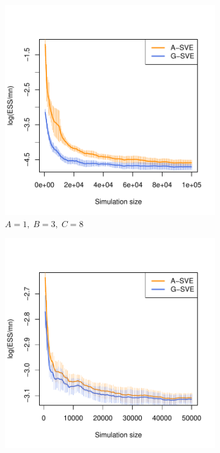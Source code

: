 \documentclass[11pt]{article}
\theoremstyle{remark}
\begin{document}
\begin{figure}[htbp]
    \centering
    
    \begin{subfigure}[h]{.4\textwidth}
      \centering
      \includegraphics[width = \textwidth]{plots/boom-ess_1_3_8.pdf}
      \caption{$A = 1, \; B = 3, \; C = 8$}
      \label{subfig:boom-ess1}
    \end{subfigure} \hspace{1cm}
    \begin{subfigure}[h]{.4\textwidth}
      \centering
      \includegraphics[width = \textwidth]{plots/boom-ess_1_10_7.pdf}

\end{subfigure}
\end{figure}
\end{document}

